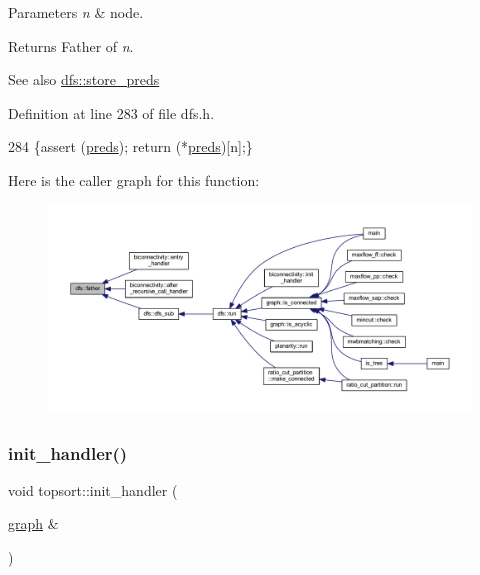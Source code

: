 \begin{DoxyParams}{Parameters}
{\em n} & node. \\
\hline
\end{DoxyParams}
\begin{DoxyReturn}{Returns}
Father of {\itshape n}. 
\end{DoxyReturn}
\begin{DoxySeeAlso}{See also}
\mbox{\hyperlink{classdfs_a7043f46eb3887cbcbb1391fc783407a4}{dfs\+::store\+\_\+preds}} 
\end{DoxySeeAlso}


Definition at line 283 of file dfs.\+h.


\begin{DoxyCode}
284     \{assert (\mbox{\hyperlink{classdfs_a3fdeb5a211a1bc1753b2a637258c5355}{preds}}); \textcolor{keywordflow}{return} (*\mbox{\hyperlink{classdfs_a3fdeb5a211a1bc1753b2a637258c5355}{preds}})[n];\}
\end{DoxyCode}
Here is the caller graph for this function\+:
\nopagebreak
\begin{figure}[H]
\begin{center}
\leavevmode
\includegraphics[width=350pt]{classdfs_a3012717ce541b3e56943e2c2c50efdf6_icgraph}
\end{center}
\end{figure}
\mbox{\label{classtopsort_a21aaf28fc280094ed43288e58d8e3ae1}} 
\subsubsection{\texorpdfstring{init\+\_\+handler()}{init\_handler()}}
{\footnotesize\ttfamily void topsort\+::init\+\_\+handler (\begin{DoxyParamCaption}\item[{\mbox{\hyperlink{classgraph}{graph}} \&}]{ }\end{DoxyParamCaption})\hspace{0.3cm}{\ttfamily [virtual]}}



